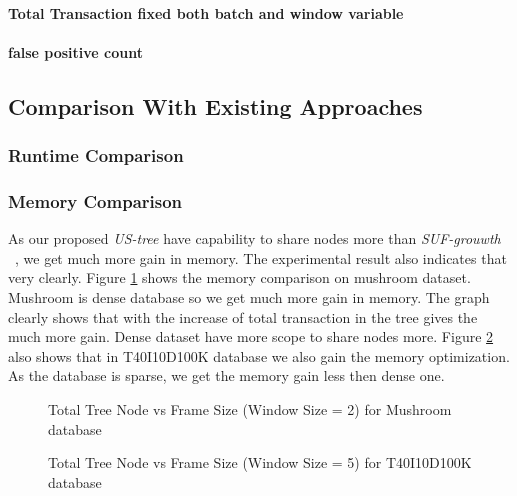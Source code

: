 		
		
		\paragraph{Total Transaction fixed both batch and window variable}
		\paragraph{false positive count}
\clearpage	
	\subsection{Comparison With Existing Approaches}
	\subsubsection{Runtime Comparison}
		
		
		
		
		
		
\clearpage		
	\subsubsection{Memory Comparison}
	As our proposed \emph{US-tree} have capability to share nodes more than \emph{SUF-grouwth} ~\cite{dataset}, we get much more gain in memory. The experimental result also indicates that very clearly. Figure \ref{result:g_m_memory_node} shows the memory comparison on mushroom dataset. Mushroom is dense database so we get  much more gain in memory. The graph clearly shows that with the increase of total transaction in the tree gives the much more gain. Dense dataset have more scope to share nodes more. Figure \ref{result:g_t10_memory_node} also shows that in T40I10D100K database we also gain the memory optimization. As the database is sparse, we get the memory gain less then dense one.
		\begin{figure}[h]
		\centering
			
		\caption{Total Tree Node vs Frame Size (Window Size = 2) for Mushroom database}
		\label{result:g_m_memory_node}
		\end{figure}
		
		\begin{figure}[h]
			
		\caption{Total Tree Node vs Frame Size (Window Size = 5) for T40I10D100K database}
		\label{result:g_t10_memory_node}
		\end{figure}
		